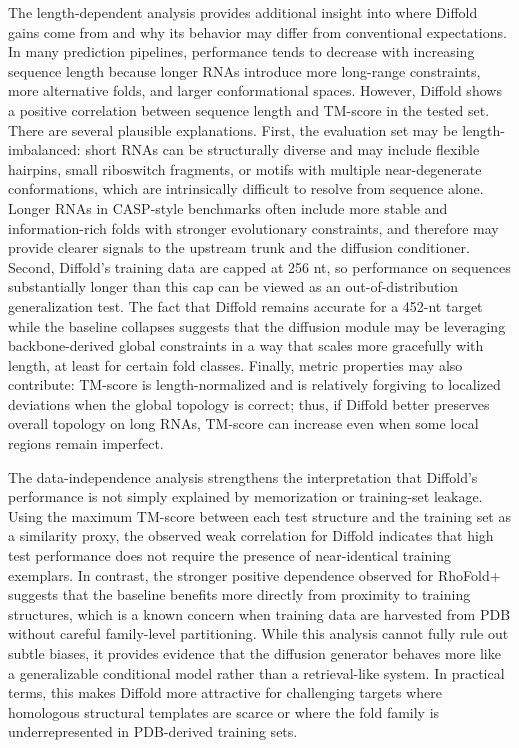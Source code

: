 The length-dependent analysis provides additional insight into where Diffold gains come from and why its behavior may differ from conventional expectations. In many prediction pipelines, performance tends to decrease with increasing sequence length because longer RNAs introduce more long-range constraints, more alternative folds, and larger conformational spaces. However, Diffold shows a positive correlation between sequence length and TM-score in the tested set. There are several plausible explanations. First, the evaluation set may be length-imbalanced: short RNAs can be structurally diverse and may include flexible hairpins, small riboswitch fragments, or motifs with multiple near-degenerate conformations, which are intrinsically difficult to resolve from sequence alone. Longer RNAs in CASP-style benchmarks often include more stable and information-rich folds with stronger evolutionary constraints, and therefore may provide clearer signals to the upstream trunk and the diffusion conditioner. Second, Diffold’s training data are capped at 256 nt, so performance on sequences substantially longer than this cap can be viewed as an out-of-distribution generalization test. The fact that Diffold remains accurate for a 452-nt target while the baseline collapses suggests that the diffusion module may be leveraging backbone-derived global constraints in a way that scales more gracefully with length, at least for certain fold classes. Finally, metric properties may also contribute: TM-score is length-normalized and is relatively forgiving to localized deviations when the global topology is correct; thus, if Diffold better preserves overall topology on long RNAs, TM-score can increase even when some local regions remain imperfect.

The data-independence analysis strengthens the interpretation that Diffold’s performance is not simply explained by memorization or training-set leakage. Using the maximum TM-score between each test structure and the training set as a similarity proxy, the observed weak correlation for Diffold indicates that high test performance does not require the presence of near-identical training exemplars. In contrast, the stronger positive dependence observed for RhoFold+ suggests that the baseline benefits more directly from proximity to training structures, which is a known concern when training data are harvested from PDB without careful family-level partitioning. While this analysis cannot fully rule out subtle biases, it provides evidence that the diffusion generator behaves more like a generalizable conditional model rather than a retrieval-like system. In practical terms, this makes Diffold more attractive for challenging targets where homologous structural templates are scarce or where the fold family is underrepresented in PDB-derived training sets.

